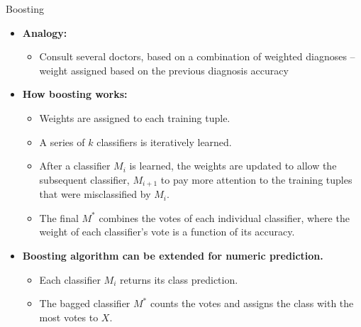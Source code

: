 \begin{frame}{Boosting}
	\begin{itemize}
		\item \textbf{Analogy:}
		      \begin{itemize}
			      \item Consult several doctors, based on a combination of weighted diagnoses -- weight assigned based on the previous diagnosis accuracy
		      \end{itemize}
		\item \textbf{How boosting works:}
		      \begin{itemize}
			      \item Weights are assigned to each training tuple.
			      \item A series of $k$ classifiers is iteratively learned.
			      \item After a classifier $M_i$ is learned, the weights are updated to allow the subsequent classifier, $M_{i+1}$ to pay more attention to the training tuples that were misclassified by $M_i$.
			      \item The final $M^*$ combines the votes of each individual classifier, where the weight of each classifier's vote is a function of its accuracy.
		      \end{itemize}
		\item \textbf{Boosting algorithm can be extended for numeric prediction.}
		      \begin{itemize}
			      \item Each classifier $M_i$ returns its class prediction.
			      \item The bagged classifier $M^*$ counts the votes and assigns the class with the most votes to $X$.
		      \end{itemize}
	\end{itemize}
\end{frame}

